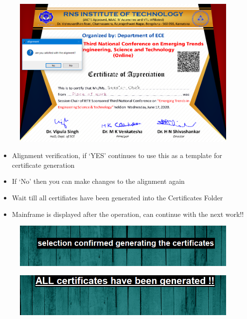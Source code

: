 \begin{figure}[H]
	\centering
	\includegraphics[width=0.9\linewidth]{"images/generation_qr_nqr/Screenshot (59)"}
	\label{fig:screenshot-59}
\end{figure}

\begin{itemize}
	\item Alignment verification, if `YES' continues to use this as a template for certificate generation
	\item If `No' then you can make changes to the alignment again
	\item Wait till all certifiates have been generated into the Certificates Folder
	\item Mainframe is displayed after the operation, can continue with the next work!!
\end{itemize}

\begin{figure}[H]
	\centering
	\includegraphics[width=0.7\linewidth]{"images/generation_qr_nqr/Screenshot (48)"}
	\label{fig:screenshot-48}
\end{figure}

\begin{figure}[H]
	\centering
	\includegraphics[width=0.7\linewidth]{"images/generation_qr_nqr/Screenshot (49)"}
	\label{fig:screenshot-49}
\end{figure}


